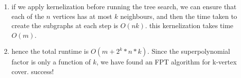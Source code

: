 \begin{enumerate}
  \item if we apply kernelization before running the tree search, we can ensure
    that each of the $n$ vertices has at most $k$ neighbours, and then the
    time taken to create the subgraphs at each step is $O(nk)$. this
    kernelization takes time $O(m)$.

  \item hence the total runtime is $O(m + 2^k * n * k)$. Since the
    superpolynomial factor is only a function of $k$, we have found an FPT
    algorithm for k-vertex cover. success!

\end{enumerate}
